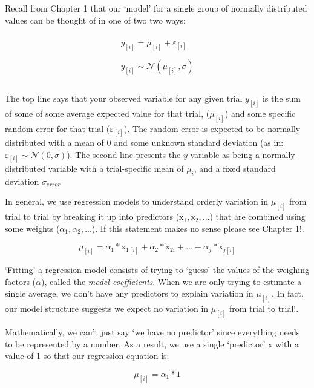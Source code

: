\documentclass[
]{book}
\begin{document}
Recall from Chapter 1 that our `model' for a single group of normally distributed values can be thought of in one of two two ways:

\begin{equation}
\begin{split}
\\
y_{[i]} = \mu_{[i]} + \varepsilon_{[i]} \\ \\
y_{[i]} \sim \mathcal{N}(\mu_{[i]},\sigma) \\ \\
\end{split}
\label{eq:21}
\end{equation}

The top line says that your observed variable for any given trial \(y_{[i]}\) is the sum of some of some average expected value for that trial, (\(\mu_{[i]}\)) and some specific random error for that trial (\(\varepsilon_{[i]}\)). The random error is expected to be normally distributed with a mean of 0 and some unknown standard deviation (as in: \(\varepsilon_{[i]} \sim \mathcal{N}(0,\sigma)\)). The second line presents the \(y\) variable as being a normally-distributed variable with a trial-specific mean of \(\mu_i\), and a fixed standard deviation \(\sigma_{error}\)

In general, we use regression models to understand orderly variation in \(\mu_{[i]}\) from trial to trial by breaking it up into predictors (\(\mathrm{x}_{1}, \mathrm{x}_{2},...\)) that are combined using some weights (\(\alpha_1, \alpha_2,...\)). If this statement makes no sense please see Chapter 1!.

\[
\mu_{[i]} = \alpha_1*\mathrm{x}_{1{[i]}} + \alpha_2*\mathrm{x}_{2i}+...+\alpha_j*\mathrm{x}_{j{[i]}}
\label{eq:22}
\]

`Fitting' a regression model consists of trying to `guess' the values of the weighing factors (\(\alpha\)), called the \emph{model coefficients}. When we are only trying to estimate a single average, we don't have any predictors to explain variation in \(\mu_{[i]}\). In fact, our model structure suggests we expect no variation in \(\mu_{[i]}\) from trial to trial!.

Mathematically, we can't just say `we have no predictor' since everything needs to be represented by a number. As a result, we use a single `predictor' \(\mathrm{x}\) with a value of 1 so that our regression equation is:

\[
\mu_{[i]} = \alpha_1*1
\label{eq:23}
\]
\end{document}
